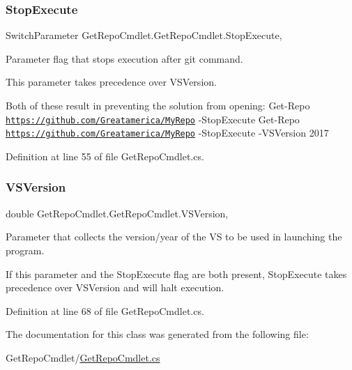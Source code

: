\subsubsection{\texorpdfstring{Stop\+Execute}{StopExecute}}
{\footnotesize\ttfamily Switch\+Parameter Get\+Repo\+Cmdlet.\+Get\+Repo\+Cmdlet.\+Stop\+Execute\hspace{0.3cm}{\ttfamily [get]}, {\ttfamily [set]}}



Parameter flag that stops execution after git command. 

This parameter takes precedence over V\+S\+Version.

Both of these result in preventing the solution from opening\+: Get-\/\+Repo \href{https://github.com/Greatamerica/MyRepo}{\tt https\+://github.\+com/\+Greatamerica/\+My\+Repo} -\/\+Stop\+Execute Get-\/\+Repo \href{https://github.com/Greatamerica/MyRepo}{\tt https\+://github.\+com/\+Greatamerica/\+My\+Repo} -\/\+Stop\+Execute -\/\+V\+S\+Version 2017 

Definition at line 55 of file Get\+Repo\+Cmdlet.\+cs.

\mbox{\label{class_get_repo_cmdlet_1_1_get_repo_cmdlet_a0fb47dd1e2551b3883abaacf1c94057c}} 
\subsubsection{\texorpdfstring{V\+S\+Version}{VSVersion}}
{\footnotesize\ttfamily double Get\+Repo\+Cmdlet.\+Get\+Repo\+Cmdlet.\+V\+S\+Version\hspace{0.3cm}{\ttfamily [get]}, {\ttfamily [set]}}



Parameter that collects the version/year of the VS to be used in launching the program. 

If this parameter and the Stop\+Execute flag are both present, Stop\+Execute takes precedence over V\+S\+Version and will halt execution. 

Definition at line 68 of file Get\+Repo\+Cmdlet.\+cs.



The documentation for this class was generated from the following file\+:\begin{DoxyCompactItemize}
\item 
Get\+Repo\+Cmdlet/\mbox{\hyperlink{_get_repo_cmdlet_8cs}{Get\+Repo\+Cmdlet.\+cs}}\end{DoxyCompactItemize}
